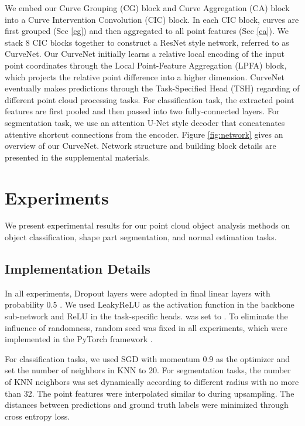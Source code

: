 \documentclass[10pt,twocolumn,letterpaper]{article}
\theoremstyle{definition}
\begin{document}
We embed our Curve Grouping (CG) block and Curve Aggregation (CA) block into a Curve Intervention Convolution (CIC) block. In each CIC block, curves are first grouped (Sec \ref{cg}) and then aggregated to all point features (Sec \ref{ca}). We stack 8 CIC blocks together to construct a ResNet \cite{he2016deep} style network, referred to as CurveNet. Our CurveNet initially learns a relative local encoding of the input point coordinates through the Local Point-Feature Aggregation (LPFA) block, which projects the relative point difference into a higher dimension. CurveNet eventually makes predictions through the Task-Specified Head (TSH) regarding of different point cloud processing tasks. For classification task, the extracted point features are first pooled and then passed into two fully-connected layers. For segmentation task, we use an attention U-Net \cite{oktay2018attention} style decoder that concatenates attentive shortcut connections from the encoder. Figure \ref{fig:network} gives an overview of our CurveNet. Network structure and building block details are presented in the supplemental materials.















\section{Experiments} \label{exp}
We present experimental results for our point cloud object analysis methods on object classification, shape part segmentation, and normal estimation tasks. 



\subsection{Implementation Details}
In all experiments, Dropout layers \cite{srivastava2014dropout} were adopted in final linear layers with probability 0.5 \cite{wang2019dynamic}. We used LeakyReLU as the activation function in the backbone sub-network and ReLU in the task-specific heads.  was set to . To eliminate the influence of randomness, random seed was fixed in all experiments, which were implemented in the PyTorch framework \cite{paszke2019pytorch}.

For classification tasks, we used SGD with momentum 0.9 as the optimizer and set the number of neighbors in KNN to 20. For segmentation tasks, the number of KNN neighbors was set dynamically according to different radius with no more than 32. The point features were interpolated similar to \cite{qi2017pointnet} during upsampling. The distances between predictions and ground truth labels were minimized through cross entropy loss.
\end{document}
